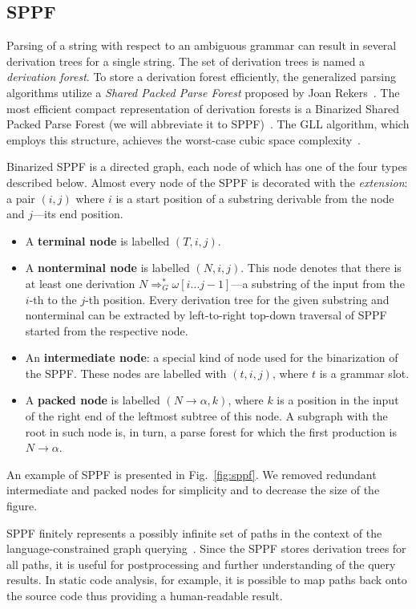 \subsection{SPPF}

Parsing of a string with respect to an ambiguous grammar can result in several derivation trees for a single string.
The set of derivation trees is named a \emph{derivation forest}.
To store a derivation forest efficiently, the generalized parsing algorithms utilize a \emph{Shared Packed Parse Forest} proposed by Joan Rekers~\cite{SPPF}.
The most efficient compact representation of derivation forests is a Binarized Shared Packed Parse Forest (we will abbreviate it to SPPF)~\cite{brnglr}.
The GLL algorithm, which employs this structure, achieves the worst-case cubic space complexity~\cite{gllParsingTree}.

Binarized SPPF is a directed graph, each node of which has one of the four types described below.
Almost every node of the SPPF is decorated with the \emph{extension}: a pair $(i, j)$ where $i$ is a start position of a substring derivable from the node and $j$---its end position.

\begin{itemize}
    \item A \textbf{terminal node} is labelled $(T, i, j)$.
    \item A \textbf{nonterminal node} is labelled $(N, i, j)$.
    This node denotes that there is at least one derivation $N \Rightarrow^*_G \omega[i \dots j-1]$---a substring of the input from the $i$-th to the $j$-th position.
    Every derivation tree for the given substring and nonterminal can be extracted by left-to-right top-down traversal of SPPF started from the respective node.
    \item An \textbf{intermediate node}: a special kind of node used for the binarization of the SPPF. These nodes are labelled with $(t,i,j)$, where $t$ is a grammar slot.
    \item A \textbf{packed node} is labelled $(N \rightarrow \alpha, k)$, where $k$ is a position in the input of the right end of the leftmost subtree of this node.
    A subgraph with the root in such node is, in turn, a parse forest for which the first production is $N \rightarrow \alpha$.
\end{itemize}


An example of SPPF is presented in Fig.~\ref{fig:sppf}.
We removed redundant intermediate and packed nodes for simplicity and to decrease the size of the figure.

SPPF finitely represents a possibly infinite set of paths in the context of the language-constrained graph querying~\cite{GrigorevR16}.
Since the SPPF stores derivation trees for all paths, it is useful for postprocessing and further understanding of the query results.
In static code analysis, for example, it is possible to map paths back onto the source code thus providing a human-readable result.